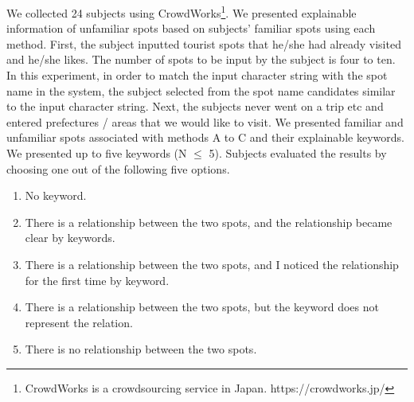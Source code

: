 \documentclass[journal]{IAENGtran}
\begin{document}
We collected 24 subjects using CrowdWorks\footnote{CrowdWorks is a crowdsourcing service in Japan. https://crowdworks.jp/}.
We presented explainable information of unfamiliar spots based on subjects' familiar spots using each method.
First, the subject inputted tourist spots that he/she had already visited and he/she likes.
The number of spots to be input by the subject is four to ten.
In this experiment, in order to match the input character string with the spot name in the system, the subject selected from the spot name candidates similar to the input character string.
Next, the subjects never went on a trip etc and entered prefectures / areas that we would like to visit.
We presented familiar and unfamiliar spots associated with methods A to C and their explainable keywords.
We presented up to five keywords (N $\le$ 5).
Subjects evaluated the results by choosing one out of the following five options.
\begin{enumerate}
  \item No keyword.
  \item There is a relationship between the two spots, and the relationship became clear by keywords.
  \item There is a relationship between the two spots, and I noticed the relationship for the first time by keyword.
  \item There is a relationship between the two spots, but the keyword does not represent the relation.
  \item There is no relationship between the two spots.
\end{enumerate}

\end{document}
